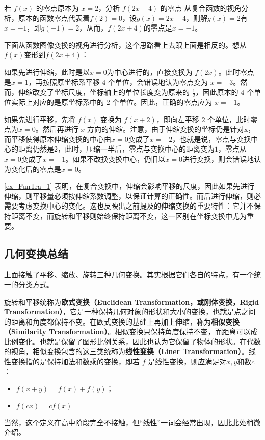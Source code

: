 \begin{example}{若 $f(x)$ 的零点原本为 $x=2$，分析 $f(2x+4)$ 的零点}\label{ex_FunTra_1}
从复合函数的视角分析，原本的函数零点代表着$f(2)=0$，设$g(x)=2x+4$，则解$g(x)=2$有$x=-1$，即$g(-1)=2$，从而，$f(2x+4)$的零点是$x=-1$。

下面从函数图像变换的视角进行分析，这个思路看上去跟上面是相反的。想从$f(x)$变形到$f(2x+4)$：

如果先进行伸缩，此时是以$x=0$为中心进行的，直接变换为 $f(2x)$。此时零点是$x=1$，再按照原坐标系平移 $4$ 个单位，会错误地认为零点变为 $x=-3$。然而，伸缩改变了坐标尺度，坐标轴上的单位长度变为原来的 $\displaystyle\frac{1}{2}$，因此原本的 $4$ 个单位实际上对应的是原坐标系中的 $2$ 个单位。因此，正确的零点应为 $x=-1$。

如果先进行平移，先将 $f(x)$ 变换为 $f(x+2)$，即向左平移 $2$ 个单位，此时零点为$x=0$。然后再进行 $x$ 方向的伸缩。注意，由于伸缩变换的坐标仍是针对x，而平移使得原本伸缩变换的中心由$x=0$变成了$x=-2$，也就是说，零点与变换中心的距离仍然是$2$，此时，压缩一半后，零点与变换中心的距离变为$1$，零点从$x=0$变成了$x=-1$。如果不改换变换中心，仍旧以$x=0$进行变换，则会错误地认为变化后的零点是$x=0$。

\end{example}

\autoref{ex_FunTra_1} 表明，在复合变换中，伸缩会影响平移的尺度，因此如果先进行伸缩，则平移量必须按伸缩系数调整，以保证计算的正确性。而后进行伸缩，则必需要考虑变换中心的变化。这也反映出之前提及的伸缩变换的重要特性：它并不保持距离不变，而旋转和平移则始终保持距离不变，这一区别在坐标变换中尤为重要。

\subsection{几何变换总结}\label{sub_FunTra_4}

上面接触了平移、缩放、旋转三种几何变换。其实根据它们各自的特点，有一个统一的分类方式。

旋转和平移统称为\textbf{欧式变换（Euclidean Transformation，或刚体变换，Rigid Transformation）}，它是一种保持几何对象的形状和大小的变换，也就是点之间的距离和角度都保持不变。在欧式变换的基础上再加上伸缩，称为\textbf{相似变换（Similarity Transformation）}。相似变换只保持角度保持不变，而距离可以成比例变化。也就是保留了图形比例关系，因此也认为它保留了物体的形状。在代数的视角，相似变换包含的这三类统称为\textbf{线性变换（Liner Transformation）}。线性变换指的是保持加法和数乘的变换，即若 $f$ 是线性变换，则应满足对$x,y$和数$c$：
\begin{itemize}
\item $f(x + y) = f(x) + f(y)$；
\item $f(cx) = cf(x)$
\end{itemize}
当然，这个定义在高中阶段完全不接触，但“线性”一词会经常出现，因此此处稍微介绍。

